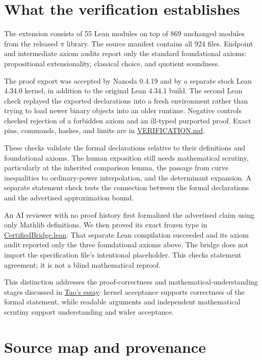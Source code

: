 \section{What the verification establishes}

The extension consists of 55 Lean modules on top of 869 unchanged modules from the released \(\pi\) library. The source manifest contains all 924 files. Endpoint and intermediate axiom audits report only the standard foundational axioms: propositional extensionality, classical choice, and quotient soundness.

The proof export was accepted by Nanoda 0.4.19 and by a separate stock Lean 4.34.0 kernel, in addition to the original Lean 4.34.1 build. The second Lean check replayed the exported declarations into a fresh environment rather than trying to load newer binary objects into an older runtime. Negative controls checked rejection of a forbidden axiom and an ill-typed purported proof. Exact pins, commands, hashes, and limits are in \href{run:lean/VERIFICATION.md}{VERIFICATION.md}.

These checks validate the formal declarations relative to their definitions and foundational axioms. The human exposition still needs mathematical scrutiny, particularly at the inherited comparison lemma, the passage from curve inequalities to ordinary-power interpolation, and the determinant expansion. A separate statement check tests the connection between the formal declarations and the advertised approximation bound.

An AI reviewer with no proof history first formalized the advertised claim using only Mathlib definitions. We then proved its exact frozen type in \href{run:review/blind-statement/CertifiedBridge.lean}{CertifiedBridge.lean}. That separate Lean compilation succeeded and its axiom audit reported only the three foundational axioms above. The bridge does not import the specification file's intentional placeholder. This checks statement agreement; it is not a blind mathematical reproof.

This distinction addresses the proof-correctness and mathematical-understanding stages discussed in \href{https://arxiv.org/html/2608.16753v1}{Tao's essay}: kernel acceptance supports correctness of the formal statement, while readable arguments and independent mathematical scrutiny support understanding and wider acceptance.

\section{Source map and provenance}

